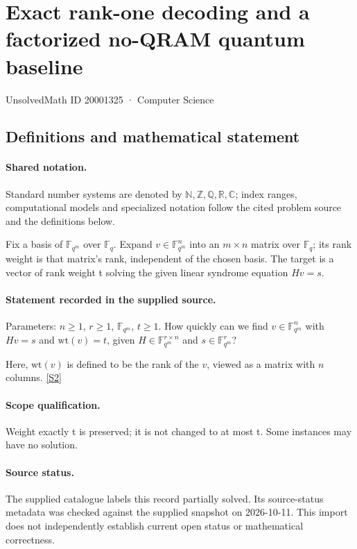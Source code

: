 \documentclass[11pt]{article}
\newcommand{\sref}[2]{\hyperlink{source:#1:#2}{[S#2]}}
\begin{document}
\setcounter{section}{20001324}
\section{Exact rank-one decoding and a factorized no-QRAM quantum baseline}\label{20001325}
{\small\sffamily UnsolvedMath ID 20001325 · Computer Science}
\subsection{Definitions and mathematical statement}

\paragraph{Shared notation.}Standard number systems are denoted by $\mathbb N,\mathbb Z,\mathbb Q,\mathbb R,\mathbb C$; index ranges, computational models and specialized notation follow the cited problem source and the definitions below.


Fix a basis of $\mathbb F_{q^m}$ over $\mathbb F_q$. Expand $v\in\mathbb F_{q^m}^n$ into an $m\times n$ matrix over $\mathbb F_q$; its rank weight is that matrix's rank, independent of the chosen basis. The target is a vector of rank weight t solving the given linear syndrome equation $Hv=s$.
\paragraph{Statement recorded in the supplied source.}
Parameters: $n \geq 1$, $r\geq 1$, $\mathbb F_{q^m}$, $t \geq 1$. How quickly can we find $v\in \mathbb F_{q^m}^n$ with $Hv = s$ and $\text{wt}(v) = t$, given $H\in \mathbb F_{q^m}^{r\times n}$ and $s\in \mathbb F_{q^m}^r$?

Here, $\text{wt}(v)$ is defined to be the rank of the $v$, viewed as a matrix with $n$ columns. \sref{20001325}{2}
\paragraph{Scope qualification.}
Weight exactly t is preserved; it is not changed to at most t. Some instances may have no solution.
\paragraph{Source status.}
The supplied catalogue labels this record partially solved. Its source-status metadata was checked against the supplied snapshot on 2026-10-11. This import does not independently establish current open status or mathematical correctness.
\end{document}
